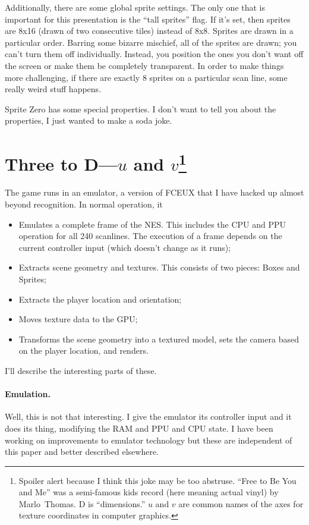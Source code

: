 \documentclass[twocolumn]{article}
\begin{document}
Additionally, there are some global sprite settings. The only one that
is important for this presentation is the ``tall sprites'' flag. If
it's set, then sprites are 8x16 (drawn of two consecutive tiles)
instead of 8x8. Sprites are drawn in a particular order. Barring some
bizarre mischief, all of the sprites are drawn; you can't turn them
off individually. Instead, you position the ones you don't want off
the screen or make them be completely transparent. In order to make
things more challenging, if there are exactly 8 sprites on a
particular scan line, some really weird stuff happens. %

Sprite Zero has some special properties. I don't want to tell you
about the properties, I just wanted to make a soda joke.

\section[Three to D---$u$ and $v$]{Three to D---$u$ and $v$\footnote{Spoiler alert because I think
this joke may be too abstruse. ``Free to Be You and Me'' was a
semi-famous kids record (here meaning actual vinyl) by
Marlo~Thomas. D is ``dimensions.'' $u$ and $v$ are common names of
the axes for texture coordinates in computer graphics.}}

The game runs in an emulator, a version of FCEUX\cite{fceux} that I
have hacked up almost beyond recognition. In normal operation, it

\begin{itemize}
\item Emulates a complete frame of the NES. This includes the CPU and
  PPU operation for all 240 scanlines. The execution of a frame depends
  on the current controller input (which doesn't change as it runs);
\item Extracts scene geometry and textures. This consists of two
  pieces: Boxes and Sprites;
\item Extracts the player location and orientation;
\item Moves texture data to the GPU;
\item Transforms the scene geometry into a textured model, sets the camera
  based on the player location, and renders.
\end{itemize}

I'll describe the interesting parts of these.

\paragraph{Emulation.}
Well, this is not that interesting. I give the emulator its controller
input and it does its thing, modifying the RAM and PPU and CPU state.
I have been working on improvements to emulator technology but these
are independent of this paper and better described elsewhere.
\end{document}

